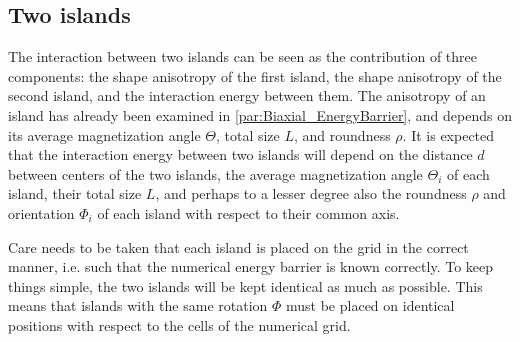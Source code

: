 \documentclass[11pt,a4paper,english]{article}
\begin{document}
\subsection{Two islands}
The interaction between two islands can be seen as the contribution of three components: the shape anisotropy of the first island, the shape anisotropy of the second island, and the interaction energy between them. The anisotropy of an island has already been examined in \cref{par:Biaxial_EnergyBarrier}, and depends on its average magnetization angle $\Theta$, total size $L$, and roundness $\rho$. It is expected that the interaction energy between two islands will depend on the distance $d$ between centers of the two islands, the average magnetization angle $\Theta_i$ of each island, their total size $L$, and perhaps to a lesser degree also the roundness $\rho$ and orientation $\Phi_i$ of each island with respect to their common axis. \par
Care needs to be taken that each island is placed on the grid in the correct manner, i.e. such that the numerical energy barrier is known correctly. To keep things simple, the two islands will be kept identical as much as possible. This means that islands with the same rotation $\Phi$ must be placed on identical positions with respect to the cells of the numerical grid.
\end{document}
